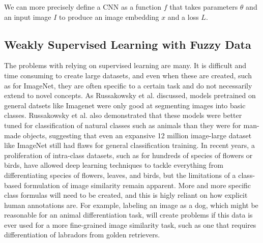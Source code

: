 \documentclass[pageno]{jpaper}
\begin{document}
We can more precisely define a CNN as a function $f$ that takes parameters $\theta$ and an input image $I$ to produce an image embedding $x$ and a loss $L$.


%



\subsection{Weakly Supervised Learning with Fuzzy Data}
The problems with relying on supervised learning are many. It is difficult and time consuming to create large datasets, and even when these are created, such as for ImageNet, they are often specific to a certain task and do not necessarily extend to novel concepts. As Russakowsky et al. discussed\cite{russakovsky2013detecting}, models pretrained on general datsets like Imagenet were only good at segmenting images into basic classes. Russakowsky et al. also demonstrated that these models were better tuned for classification of natural classes such as animals than they were for man-made objects, suggesting that even an expansive 12 million image-large dataset like ImageNet still had flaws for general classification training. In recent years, a proliferation of intra-class datasets, such as for hundreds of species of flowers or birds, have allowed deep learning techniques to tackle everything from differentiating species of flowers\cite{angelova2013image}, leaves\cite{rejeb2013vantage}, and birds\cite{berg2014birdsnap}, but the limitations of a class-based formulation of image similarity remain apparent. More and more specific class formulas will need to be created, and this is higly reliant on how explicit human annotations are. For example, labeling an image as a dog, which might be reasonable for an animal differentiation task, will create problems if this data is ever used for a more fine-grained image similarity task, such as one that requires differentiation of labradors from golden retrievers.\\
\end{document}
